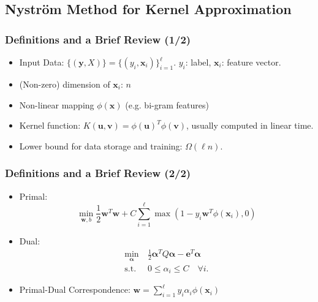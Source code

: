 \documentclass[14pt,xcolor=pstdvips]{beamer}
\def\bw{{\boldsymbol w}}
\def\bu{{\boldsymbol u}}
\def\bv{{\boldsymbol v}}
\def\bx{{\boldsymbol x}}
\def\by{{\boldsymbol y}}
\def\balpha{{\boldsymbol \alpha}}
\def\be{{\boldsymbol e}}
\begin{document}
\subsection{Nystr\"om Method for Kernel Approximation}
\begin{frame}
  \frametitle{Definitions and a Brief Review (1/2)}
  \begin{itemize}
    \item Input Data: $\{(\by, X)\} = \{(y_i, \bx_i)\}_{i=1}^\ell$. $y_i$: label, $\bx_i$: feature vector.
    \item (Non-zero) dimension of $\bx_i$: $n$
    \item Non-linear mapping $\phi(\bx)$ (e.g. bi-gram features)
    \item Kernel function: $K(\bu, \bv) = \phi(\bu)^T \phi(\bv)$, usually computed in linear time.
    \pause
    \item Lower bound for data storage and training: $\Omega(\ell n)$.
  \end{itemize}
\end{frame}

\begin{frame}
  \frametitle{Definitions and a Brief Review (2/2)}
  \begin{itemize}
    \item Primal:
    \begin{equation}
      \min_{\bw, b}
      \frac{1}{2} \bw^T\bw + C\sum_{i=1}^\ell \max(1-y_i\bw^T\phi(\bx_i), 0) \nonumber
    \end{equation} 
    \item Dual: 
    \begin{align}
    \min_{\balpha} \  &  \frac{1}{2} \balpha^T Q  \balpha - \be^T \balpha \nonumber \\
    \mbox{s.t.} \  & 0 \le \alpha_i \le C \quad \forall i \mbox{.} \nonumber
    \end{align}
    \item Primal-Dual Correspondence: $\bw = \sum_{i=1}^\ell y_i \alpha_i \phi(\bx_i)$ 
  \end{itemize}
\end{frame}
\end{document}

